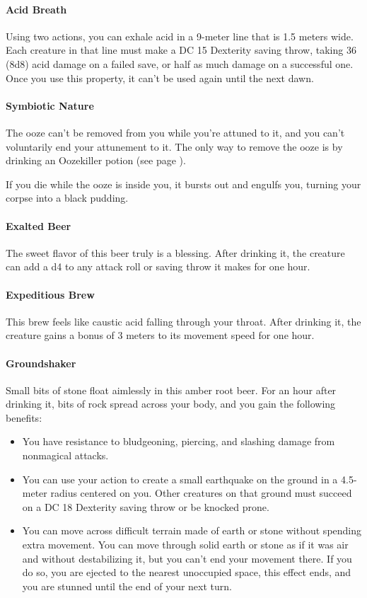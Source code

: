    \paragraph{Acid Breath} Using two actions, you can exhale acid in a 9-meter line that is 1.5 meters wide.
    Each creature in that line must make a DC 15 Dexterity saving throw, taking 36 (8d8) acid damage on a failed save, or half as much damage on a successful one.
    Once you use this property, it can't be used again until the next dawn.
    \paragraph{Symbiotic Nature} The ooze can't be removed from you while you're attuned to it, and you can't voluntarily end your attunement to it.
    The only way to remove the ooze is by drinking an Oozekiller potion (see page \pageref{item::oozekiller}).

    If you die while the ooze is inside you, it bursts out and engulfs you, turning your corpse into a black pudding.
\paragraph{Exalted Beer} %
    The sweet flavor of this beer truly is a blessing.
    After drinking it, the creature can add a d4 to any attack roll or saving throw it makes for one hour.
\paragraph{Expeditious Brew} %
    This brew feels like caustic acid falling through your throat.
    After drinking it, the creature gains a bonus of 3 meters to its movement speed for one hour.
\paragraph{Groundshaker} %
    Small bits of stone float aimlessly in this amber root beer.
    For an hour after drinking it, bits of rock spread across your body, and you gain the following benefits:
    \begin{itemize}
        \item You have resistance to bludgeoning, piercing, and slashing damage from nonmagical attacks.
        \item You can use your action to create a small earthquake on the ground in a 4.5-meter radius centered on you.
        Other creatures on that ground must succeed on a DC 18 Dexterity saving throw or be knocked prone.
        \item You can move across difficult terrain made of earth or stone without spending extra movement.
        You can move through solid earth or stone as if it was air and without destabilizing it, but you can't end your movement there.
        If you do so, you are ejected to the nearest unoccupied space, this effect ends, and you are stunned until the end of your next turn.
    \end{itemize}
